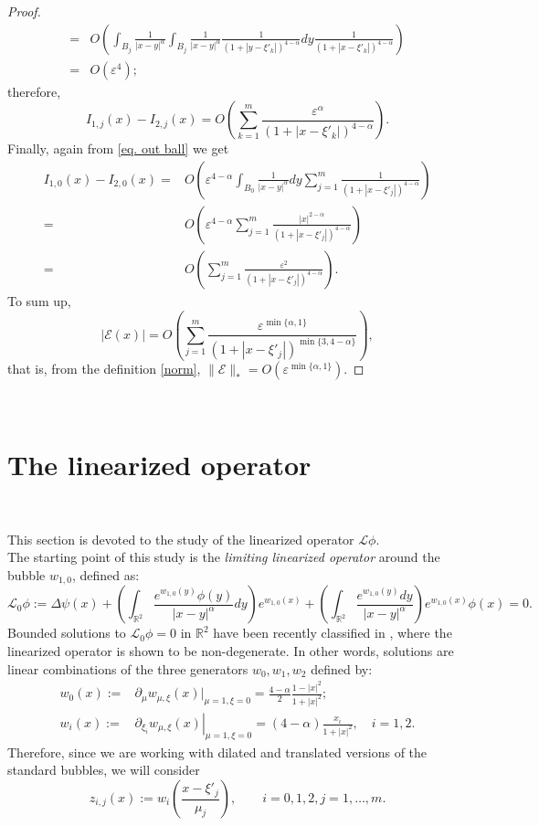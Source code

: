 \documentclass[11pt]{article}
\begin{document}
\begin{proof}
\begin{align*}
=&O\left(\int_{B_j}\frac1{|x-y|^\alpha}\int_{B_j}\frac1{|x-y|^\alpha}\frac1{\left(1+\left|y-\xi'_k\right|\right)^{4-\alpha}}dy\frac1{\left(1+\left|x-\xi'_k\right|\right)^{4-\alpha}}\right)\\
=&O\left(\varepsilon^4\right);
\end{align*}
therefore,
$$I_{1,j}(x)-I_{2,j}(x)=O\left(\sum_{k=1}^m\frac{\varepsilon^\alpha}{\left(1+\left|x-\xi'_k\right|\right)^{4-\alpha}}\right).$$
Finally, again from \eqref{eq. out ball} we get
\begin{align*}
I_{1,0}(x)-I_{2,0}(x)=&O\left(\varepsilon^{4-\alpha}\int_{B_0}\frac1{|x-y|^\alpha}dy\sum_{j=1}^m\frac1{\left(1+\left|x-\xi'_j\right|\right)^{4-\alpha}}\right)\\
=&O\left(\varepsilon^{4-\alpha}\sum_{j=1}^m\frac{|x|^{2-\alpha}}{\left(1+\left|x-\xi'_j\right|\right)^{4-\alpha}}\right)\\
=&O\left(\sum_{j=1}^m\frac{\varepsilon^2}{\left(1+\left|x-\xi'_j\right|\right)^{4-\alpha}}\right).
\end{align*}
To sum up,$$
|\mathcal E(x)|=O\left(\sum_{j=1}^m\frac{\varepsilon^{\min\{\alpha,1\}}}{\left(1+\left|x-\xi'_j\right|\right)^{\min\{3,4-\alpha\}}}\right),$$
that is, from the definition \eqref{norm}, $\|\mathcal E\|_\ast=O\left(\varepsilon^{\min\{\alpha,1\}}\right)$.
\end{proof}\

\section{The linearized operator}\

This section is devoted to the study of the linearized operator $\mathcal L\phi$.\\

The starting point of this study is the \emph{limiting linearized operator} around the bubble $w_{1,0}$, defined as:
$$\mathcal L_0\phi:=\Delta\psi(x)+\left(\int_{\mathbb R^2}\frac{e^{w_{1,0}(y)}\phi(y)}{|x-y|^\alpha}dy\right)e^{w_{1,0}(x)}+\left(\int_{\mathbb R^2}\frac{e^{w_{1,0}(y)}dy}{|x-y|^\alpha}\right)e^{w_{1,0}(x)}\phi(x)=0.$$
Bounded solutions to $\mathcal L_0\phi=0$ in $\mathbb R^2$ have been recently classified in \cite{gaol}, where the linearized operator is shown to be non-degenerate. In other words, solutions are linear combinations of the three generators $w_0,w_1,w_2$ defined by:
\begin{align*}
w_0(x):=&\partial_\mu w_{\mu,\xi}(x)|_{\mu=1,\xi=0}=\frac{4-\alpha}2\frac{1-|x|^2}{1+|x|^2};\\
w_i(x):=&\left.\partial_{\xi_i}w_{\mu,\xi}(x)\right|_{\mu=1,\xi=0}=(4-\alpha)\frac{x_i}{1+|x|^2},\quad i=1,2.
\end{align*}
Therefore, since we are working with dilated and translated versions of the standard bubbles, we will consider
\begin{equation}\label{zij}
z_{i,j}(x):=w_i\left(\frac{x-\xi'_j}{\mu_j}\right),\qquad i=0,1,2,j=1,\dots,m.
\end{equation}\
\end{document}
